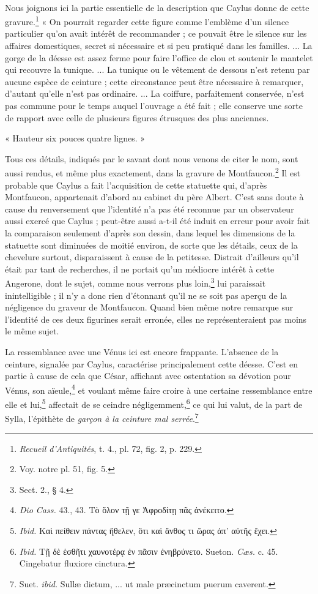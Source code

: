 \documentclass[a4paper, 11pt, oneside, polutonikogreek, french]{article}
\begin{document}
\paragraph{}
Nous joignons ici la partie essentielle de la description que Caylus donne de cette gravure.\footnote{\emph{Recueil d'Antiquités}, t. 4., pl. 72, fig. 2, p. 229.} « On pourrait regarder cette figure comme l'emblème d'un silence particulier qu'on avait intérêt de recommander ; ce pouvait être le silence sur les affaires domestiques, secret si nécessaire et si peu pratiqué dans les familles. ... La gorge de la déesse est assez ferme pour faire l'office de clou et soutenir le mantelet qui recouvre la tunique. ... La tunique ou le vêtement de dessous n'est retenu par aucune espèce de ceinture ; cette circonstance peut être nécessaire à remarquer, d'autant qu'elle n'est pas ordinaire. ... La coiffure, parfaitement conservée, n'est pas commune pour le temps auquel l'ouvrage a été fait ; elle conserve une sorte de rapport avec celle de plusieurs figures étrusques des plus anciennes.

« Hauteur six pouces quatre lignes. »

Tous ces détails, indiqués par le savant dont nous venons de citer le nom, sont aussi rendus, et même plus exactement, dans la gravure de Montfaucon.\footnote{Voy. notre pl. 51, fig. 5.} Il est probable que Caylus a fait l'acquisition de cette statuette qui, d'après Montfaucon, appartenait d'abord au cabinet du père Albert. C'est sans doute à cause du renversement que l'identité n'a pas été reconnue par un observateur aussi exercé que Caylus ; peut-être aussi a-t-il été induit en erreur pour avoir fait la comparaison seulement d'après son dessin, dans lequel les dimensions de la statuette sont diminuées de moitié environ, de sorte que les détails, ceux de la chevelure surtout, disparaissent à cause de la petitesse. Distrait d'ailleurs qu'il était par tant de recherches, il ne portait qu'un médiocre intérêt à cette Angerone, dont le sujet, comme nous verrons plus loin,\footnote{Sect. 2., § 4.} lui paraissait inintelligible ; il n'y a donc rien d'étonnant qu'il ne se soit pas aperçu de la négligence du graveur de Montfaucon. Quand bien même notre remarque sur l'identité de ces deux figurines serait erronée, elles ne représenteraient pas moins le même sujet.

La ressemblance avec une Vénus ici est encore frappante. L'absence de la ceinture, signalée par Caylus, caractérise principalement cette déesse. C'est en partie à cause de cela que César, affichant avec ostentation sa dévotion pour Vénus, son aïeule,\footnote{\emph{Dio Cass.} 43., 43. Τὸ ὅλον τῇ γε Ἀφροδίτῃ πᾶς ἀνέκειτο.} et voulant même faire croire à une certaine ressemblance entre elle et lui,\footnote{\emph{Ibid.} Καὶ πείθειν πάντας ἤθελεν, ὃτι καὶ ἄνθος τι ὥρας ἀπ' αὐτῆς ἔχει.} affectait de se ceindre négligemment,\footnote{\emph{Ibid.} Τῇ δὲ ἑσθῆτι χαυνοτέρᾳ ἐν πᾶσιν ἐνηβρύνετο. Sueton. \emph{Cæs.} c. 45. Cingebatur fluxiore cinctura.} ce qui lui valut, de la part de Sylla, l'épithète de \emph{garçon à la ceinture mal serrée}.\footnote{Suet. \emph{ibid.} Sullæ dictum, ... ut male præcinctum puerum caverent.}
\end{document}
